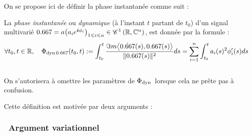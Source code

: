 On se propose ici de définir la phase instantanée comme suit :
\begin{definition} \label{def:phase_d}
	La \emph{phase instantanée} ou \emph{dynamique} (à l'instant $t$ partant de $t_0$) d'un signal multivarié $\x = a\big(a_ie^{\i \phi_i}\big)_{1\leq i\leq n} \in \conti[1]{\R}{\C^n}$, est donnée par la formule :
	\begin{equation} \label{eq:phase_d}
		\forall t_0, t\in\R, \quad \phased[\x](t_0,t) \defeq \int_{t_0}^t \frac{\Im m \big\langle \dot{\x}(s) , \x(s) \big\rangle}{\|\x(s)\|^2} ds =\sum_{i=1}^n \int_{t_0}^t a_i(s)^2 \phi_i'(s)ds
	\end{equation}
	\\
	On s'autorisera à omettre les paramètres de $\Phi_{\text{\normalfont dyn}\, }$ lorsque cela ne prête pas à confusion.
\end{definition}
\skipl

Cette définition est motivée par deux arguments :



\subsubsection*{\textbullet\ Argument variationnel}

